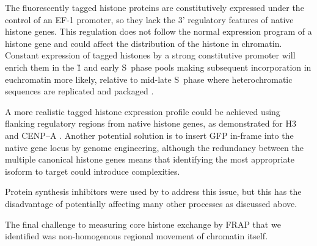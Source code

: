     The fluorescently tagged histone proteins are constitutively expressed
    under the control of an EF-1\textalpha{} promoter,
    so they lack the 3' regulatory features of native histone genes.
    This regulation does not follow the normal
    expression program of a histone gene
    and could affect the distribution of the histone in chromatin.
    Constant expression of tagged histones by a strong constitutive promoter
    will enrich them in the \G1{} and early S~phase pools
    making subsequent incorporation in euchromatin more likely,
    relative to mid-late S~phase where heterochromatic sequences
    are replicated and packaged \citep{DNA-replication-timing}.

    A more realistic tagged histone expression profile could be achieved using
    flanking regulatory regions from native histone genes,
    as demonstrated for H3 and CENP--A \citep{pMH3-plasmid,Kevin-pCA-TAG}.
    Another potential solution is to insert GFP
    in-frame into the native gene locus by genome engineering,
    although the redundancy between the multiple canonical histone genes means
    that identifying the most appropriate isoform to target
    could introduce complexities.

    Protein synthesis inhibitors were used by \citet{KimuraCook}
    to address this issue,
    but this has the disadvantage of potentially affecting
    many other processes as discussed above.



    The final challenge to measuring core histone
    exchange by FRAP that we identified
    was non-homogenous regional movement of chromatin itself.

